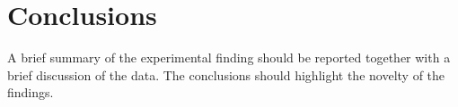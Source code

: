\chapter{Conclusions}

A brief summary of the experimental finding should be reported together with a brief discussion
of the data. The conclusions should highlight the novelty of the findings.

